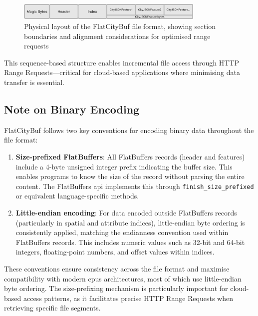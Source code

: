 \begin{figure}[h]
  \centering
  \includegraphics[width=0.8\textwidth]{figs/methodology/file_structure.png}
  \caption{Physical layout of the FlatCityBuf file format, showing section boundaries and alignment considerations for optimised range requests}
  \label{fig:methodology:file-structure}
\end{figure}

This sequence-based structure enables incremental file access through HTTP Range Requests—critical for cloud-based applications where minimising data transfer is essential.

\subsection{Note on Binary Encoding}
\label{methodology:overview:note_on_binary_encoding}
FlatCityBuf follows two key conventions for encoding binary data throughout the file format:

\begin{enumerate}
  \item \textbf{Size-prefixed FlatBuffers}: All FlatBuffers records (header and features) include a 4-byte unsigned integer prefix indicating the buffer size. This enables programs to know the size of the record without parsing the entire content. The FlatBuffers \ac{api} implements this through \texttt{finish\_size\_prefixed} or equivalent language-specific methods.
  \item \textbf{Little-endian encoding}: For data encoded outside FlatBuffers records (particularly in spatial and attribute indices), little-endian byte ordering is consistently applied, matching the endianness convention used within FlatBuffers records. This includes numeric values such as 32-bit and 64-bit integers, floating-point numbers, and offset values within indices.
\end{enumerate}

These conventions ensure consistency across the file format and maximise compatibility with modern \acp{cpu} architectures, most of which use little-endian byte ordering. The size-prefixing mechanism is particularly important for cloud-based access patterns, as it facilitates precise HTTP Range Requests when retrieving specific file segments.
